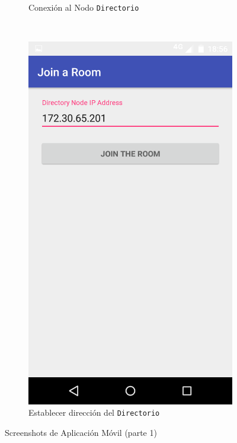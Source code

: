 {\begin{figure}[H]
\begin{subfigure}[b]{0.4\textwidth}
        \caption{Conexión al Nodo \texttt{Directorio}}
        \label{fig:mobile_connect}
    \end{subfigure}
    ~
    \begin{subfigure}[b]{0.4\textwidth}
        \includegraphics[width=\textwidth]{imagenes/mobile_connect.png}
        \caption{Establecer dirección del \texttt{Directorio}}
        \label{fig:mobile_set_ip}
    \end{subfigure}
    \caption{Screenshots de Aplicación Móvil (parte 1)}\label{fig:mobile_screenshots_1}
\end{figure}

}
